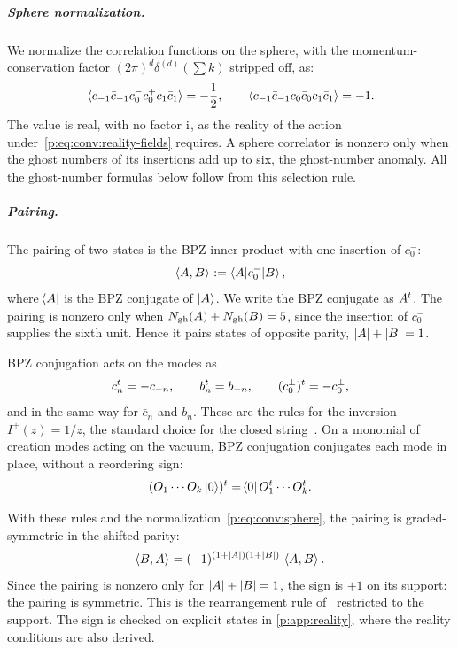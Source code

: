 \subparagraph{Sphere normalization.}

We normalize the correlation functions on the sphere, with the momentum-conservation factor $(2\pi)^d \delta^{(d)}(\sum k)$ stripped off, as:
\begin{equation}
  \label{p:eq:conv:sphere}
  \braket{c_{-1} \bar c_{-1} c_0^- c_0^+ c_1 \bar c_1}
    = - \frac{1}{2},
  \qquad
  \braket{c_{-1} \bar c_{-1} c_0 \bar c_0 c_1 \bar c_1}
    = - 1.
\end{equation}
The value is real, with no factor $\mathrm{i}$, as the reality of the action under~\eqref{p:eq:conv:reality-fields} requires.
A sphere correlator is nonzero only when the ghost numbers of its insertions add up to six, the ghost-number anomaly.
All the ghost-number formulas below follow from this selection rule.


\subparagraph{Pairing.}

The pairing of two states is the BPZ inner product with one insertion of $c_0^-$:
\begin{equation}
  \label{p:eq:conv:pairing}
  \braket{A, B}_{}
    := \braket{A | c_0^- | B},
\end{equation}
where $\mathinner{{}_{}\hspace{-2pt}\langle A |}$ is the BPZ conjugate of $\ket{A}$.
We write the BPZ conjugate as ${A^t}$.
The pairing is nonzero only when $N_{\text{gh}}(A) + N_{\text{gh}}(B) = 5$, since the insertion of $c_0^-$ supplies the sixth unit.
Hence it pairs states of opposite parity, ${|A|} + {|B|} = 1$.

BPZ conjugation acts on the modes as
\begin{equation}
\label{p:eq:conv:bpz-modes}
{c_n^t}
  = - c_{-n},
\qquad
{b_n^t}
  = b_{-n},
\qquad
{(c_0^\pm)^t}
  = - c_0^\pm,
\end{equation}
and in the same way for $\bar c_n$ and $\bar b_n$.
These are the rules for the inversion $I^+(z) = 1/z$, the standard choice for the closed string~\cite[footnote p.~13]{Zwiebach:1993:ClosedStringField}.
On a monomial of creation modes acting on the vacuum, BPZ conjugation conjugates each mode in place, without a reordering sign:
\begin{equation}
  \label{p:eq:conv:bpz-word}
  {(O_1 \cdots O_k \ket{0})^t}
    = \mathinner{{}_{}\hspace{-2pt}\langle 0 |} {O_1^t} \cdots {O_k^t}.
\end{equation}

With these rules and the normalization~\eqref{p:eq:conv:sphere}, the pairing is graded-symmetric in the shifted parity:
\begin{equation}
\label{p:eq:conv:pairing-symmetry}
\braket{B, A}_{}
  = (-1)^{(1 + {|A|}) (1 + {|B|})} \, \braket{A, B}_{}.
\end{equation}
Since the pairing is nonzero only for ${|A|} + {|B|} = 1$, the sign is $+1$ on its support: the pairing is symmetric.
This is the rearrangement rule of~\cite{Erbin:2021:StringFieldTheory} restricted to the support.
The sign is checked on explicit states in \cref{p:app:reality}, where the reality conditions are also derived.


